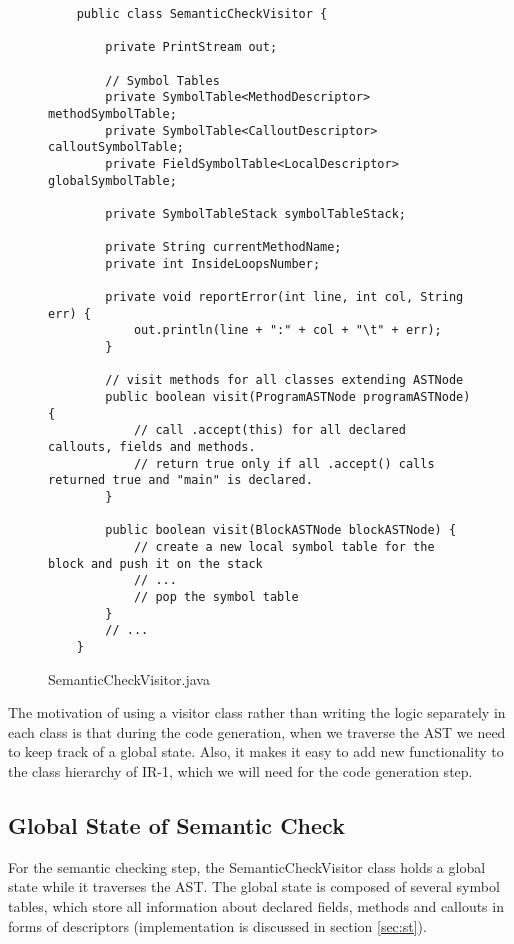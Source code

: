 \documentclass{article}[11pt]
\begin{document}
\begin{figure}
    \begin{lstlisting}
    public class SemanticCheckVisitor {
    
        private PrintStream out;
        
        // Symbol Tables
        private SymbolTable<MethodDescriptor> methodSymbolTable;
        private SymbolTable<CalloutDescriptor> calloutSymbolTable;
        private FieldSymbolTable<LocalDescriptor> globalSymbolTable;
    
        private SymbolTableStack symbolTableStack;
        
        private String currentMethodName;
        private int InsideLoopsNumber;
        
        private void reportError(int line, int col, String err) {
            out.println(line + ":" + col + "\t" + err);
        }
        
        // visit methods for all classes extending ASTNode
        public boolean visit(ProgramASTNode programASTNode) {
            // call .accept(this) for all declared callouts, fields and methods.
            // return true only if all .accept() calls returned true and "main" is declared.
        }
        
        public boolean visit(BlockASTNode blockASTNode) {
            // create a new local symbol table for the block and push it on the stack
            // ...
            // pop the symbol table
        }
        // ...
    }
    \end{lstlisting}
    \caption{SemanticCheckVisitor.java}
    \label{code:semantic}
\end{figure}

The motivation of using a visitor class rather than writing the logic separately in each class is that during the code generation, when we traverse the AST we need to keep track of a global state. Also, it makes it easy to add new functionality to the class hierarchy of IR-1, which we will need for the code generation step.

\subsection{Global State of Semantic Check}
For the semantic checking step, the SemanticCheckVisitor class holds a global state while it traverses the AST. The global state is composed of several symbol tables, which store all information about declared fields, methods and callouts in forms of descriptors (implementation is discussed in section \ref{sec:st}).
\end{document}
